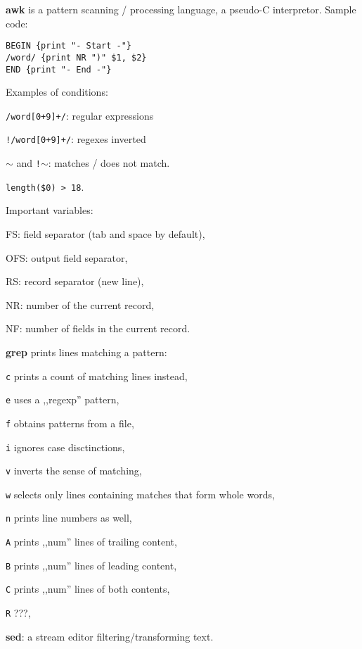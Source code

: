 \renewcommand\theFancyVerbLine{\normalsize\arabic{FancyVerbLine}}

\begin{enumx}
	\item [\cmd] \textbf{awk} is a pattern scanning / processing language,
	a pseudo-C interpretor.
	Sample code:
\begin{verbatim}
BEGIN {print "- Start -"}
/word/ {print NR ")" $1, $2}
END {print "- End -"}
\end{verbatim}

\item [] Examples of conditions:
\begin{enumx}
	\item \texttt{/word[0+9]+/}: regular expressions
	\item \texttt{!/word[0+9]+/}: regexes inverted
	\item \texttt{$\sim$} and \texttt{!$\sim$}: matches / does not match.
	\item \texttt{length(\$0) > 18}.
\end{enumx} 

\item [] Important variables:
\begin{enumx}
	\item FS: field separator (tab and space by default),
	\item OFS: output field separator,
	\item RS: record separator (new line),
	\item NR: number of the current record,
	\item NF: number of fields in the current record.
\end{enumx} 

\item [\cmd] \textbf{grep} prints lines matching a pattern:
\item [\texttt{c}] prints a count of matching lines instead,
\item [\texttt{e}] uses a ,,regexp'' pattern,
\item [\texttt{f}] obtains patterns from a file,
\item [\texttt{i}] ignores case disctinctions,
\item [\texttt{v}] inverts the sense of matching,
\item [\texttt{w}] selects only lines containing matches that form whole words,
\item [\texttt{n}] prints line numbers as well,
\item [\texttt{A}] prints ,,num'' lines of trailing content,
\item [\texttt{B}] prints ,,num'' lines of leading content,
\item [\texttt{C}] prints ,,num'' lines of both contents,
\item [\texttt{R}] ???,
\item [\cmd] \textbf{sed}: a stream editor filtering/transforming text.
\end{enumx}

